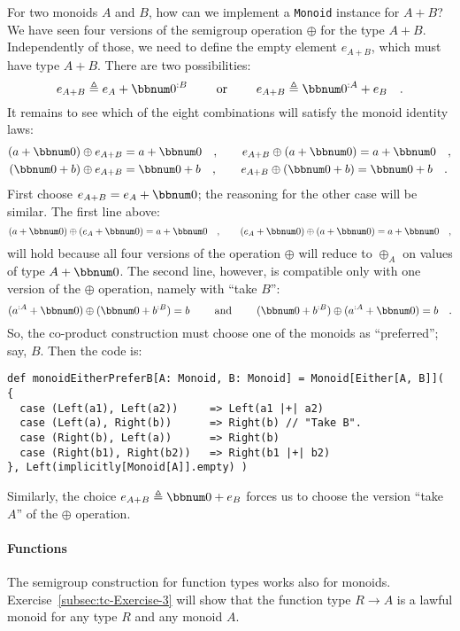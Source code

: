 For two monoids $A$ and $B$, how can we implement a \lstinline!Monoid!
instance for $A+B$? We have seen four versions of the semigroup operation
$\oplus$ for the type $A+B$. Independently of those, we need to
define the empty element $e_{A+B}$, which must have type $A+B$.
There are two possibilities: 
\[
e_{A+B}\triangleq e_{A}+\bbnum 0^{:B}\quad\quad\text{ or }\quad\quad e_{A+B}\triangleq\bbnum 0^{:A}+e_{B}\quad.
\]
It remains to see which of the eight combinations will satisfy the
monoid identity laws:
\begin{align*}
\left(a+\bbnum 0\right)\oplus e_{A+B} & =a+\bbnum 0\quad,\quad\quad e_{A+B}\oplus\left(a+\bbnum 0\right)=a+\bbnum 0\quad,\\
\left(\bbnum 0+b\right)\oplus e_{A+B} & =\bbnum 0+b\quad,\quad\quad e_{A+B}\oplus\left(\bbnum 0+b\right)=\bbnum 0+b\quad.
\end{align*}
First choose $e_{A+B}=e_{A}+\bbnum 0$; the reasoning for the other
case will be  similar. The first line above:
\[
\left(a+\bbnum 0\right)\oplus\left(e_{A}+\bbnum 0\right)=a+\bbnum 0\quad,\quad\quad\left(e_{A}+\bbnum 0\right)\oplus\left(a+\bbnum 0\right)=a+\bbnum 0\quad,
\]
will hold because all four versions of the operation $\oplus$ will
reduce to $\oplus_{A}$ on values of type $A+\bbnum 0$. The second
line, however, is compatible only with one version of the $\oplus$
operation, namely with \textsf{``}take $B$\textsf{''}:
\[
(a^{:A}+\bbnum 0)\oplus(\bbnum 0+b^{:B})=b\quad\quad\text{ and }\quad\quad(\bbnum 0+b^{:B})\oplus(a^{:A}+\bbnum 0)=b\quad.
\]
So, the co-product construction must choose one of the monoids as
\textsf{``}preferred\textsf{''}; say, $B$. Then the code is:
\begin{lstlisting}
def monoidEitherPreferB[A: Monoid, B: Monoid] = Monoid[Either[A, B]]( {
  case (Left(a1), Left(a2))     => Left(a1 |+| a2)
  case (Left(a), Right(b))      => Right(b) // "Take B".
  case (Right(b), Left(a))      => Right(b)
  case (Right(b1), Right(b2))   => Right(b1 |+| b2)
}, Left(implicitly[Monoid[A]].empty) )
\end{lstlisting}
Similarly, the choice $e_{A+B}\triangleq\bbnum 0+e_{B}$ forces us
to choose the version \textsf{``}take $A$\textsf{''} of the $\oplus$ operation.

\paragraph{Functions}

The semigroup construction for function types works also for monoids.
Exercise~\ref{subsec:tc-Exercise-3} will show that the function
type $R\rightarrow A$ is a lawful monoid for any type $R$ and any
monoid $A$.

